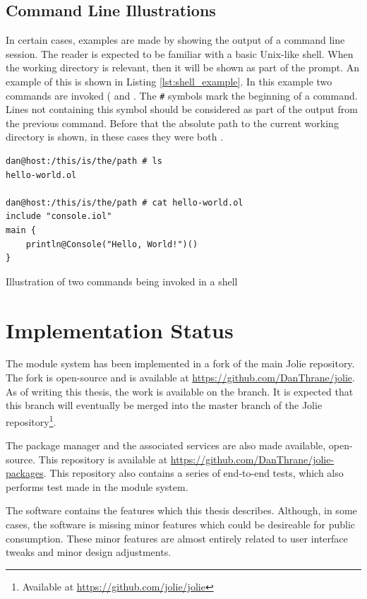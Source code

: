 \subsection*{Command Line Illustrations}

In certain cases, examples are made by showing the output of a command line
session. The reader is expected to be familiar with a basic Unix-like shell.
When the working directory is relevant, then it will be shown as part of the
prompt. An example of this is shown in Listing \ref{lst:shell_example}.  In
this example two commands are invoked ( and .
The \verb!#! symbols mark the beginning of a command. Lines not
containing this symbol should be considered as part of the output from
the previous command. Before that the absolute path to the current
working directory is shown, in these cases they were both
.

\begin{listing}[H]
\begin{verbatim}
dan@host:/this/is/the/path # ls
hello-world.ol

dan@host:/this/is/the/path # cat hello-world.ol
include "console.iol"
main {
    println@Console("Hello, World!")()
}
\end{verbatim}
\caption{Illustration of two commands being invoked in a shell}
\label{lst:shell_example}
\end{listing}

\section{Implementation Status}

The module system has been implemented in a fork of the main Jolie repository.
The fork is open-source and is available at
\url{https://github.com/DanThrane/jolie}. As of writing this thesis, the work
is available on the  branch. It is expected that this
branch will eventually be merged into the master branch of the Jolie
repository\footnote{Available at \url{https://github.com/jolie/jolie}}.

The package manager and the associated services are also made available,
    open-source. This repository is available at
    \url{https://github.com/DanThrane/jolie-packages}. This repository also
    contains a series of end-to-end tests, which also performs test made in
    the module system.

The software contains the features which this thesis describes. Although, in
some cases, the software is missing minor features which could be
desireable for public consumption. These minor features are almost entirely
related to user interface tweaks and minor design adjustments.

